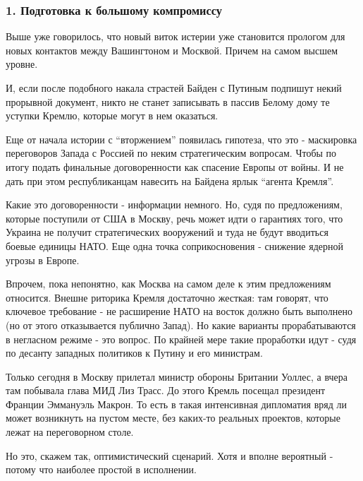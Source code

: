  
 
 
 
 

\subsubsection{1. Подготовка к большому компромиссу}

Выше уже говорилось, что новый виток истерии уже становится прологом для новых
контактов между Вашингтоном и Москвой. Причем на самом высшем уровне.

И, если после подобного накала страстей Байден с Путиным подпишут некий
прорывной документ, никто не станет записывать в пассив Белому дому те уступки
Кремлю, которые могут в нем оказаться. 

Еще от начала истории с \enquote{вторжением} появилась гипотеза, что это -
маскировка переговоров Запада с Россией по неким стратегическим вопросам. Чтобы
по итогу подать финальные договоренности как спасение Европы от войны. И не
дать при этом республиканцам навесить на Байдена ярлык \enquote{агента Кремля}. 

Какие это договоренности - информации немного. Но, судя по предложениям,
которые поступили от США в Москву, речь может идти о гарантиях того, что
Украина не получит стратегических вооружений и туда не будут вводиться боевые
единицы НАТО. Еще одна точка соприкосновения - снижение ядерной угрозы в
Европе.

Впрочем, пока непонятно, как Москва на самом деле к этим предложениям
относится. Внешне риторика Кремля достаточно жесткая: там говорят, что ключевое
требование - не расширение НАТО на восток должно быть выполнено (но от этого
отказывается публично Запад). Но какие варианты прорабатываются в негласном
режиме - это вопрос. По крайней мере такие проработки идут - судя по десанту
западных политиков к Путину и его министрам. 

Только сегодня в Москву прилетал министр обороны Британии Уоллес, а вчера там
побывала глава МИД Лиз Трасс. До этого Кремль посещал президент Франции
Эммануэль Макрон. То есть в такая интенсивная дипломатия вряд ли может
возникнуть на пустом месте, без каких-то реальных проектов, которые лежат на
переговорном столе. 

Но это, скажем так, оптимистический сценарий. Хотя и вполне вероятный - потому
что наиболее простой в исполнении. 

